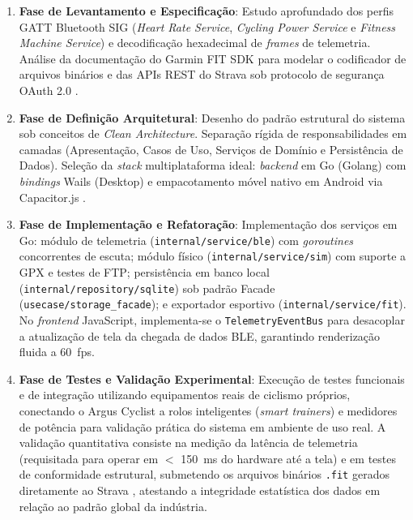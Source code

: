 \documentclass[
    a4paper,
    12pt,
    oneside,
    english,
    brazil,
    chapter=TITLE,
    section=TITLE,
]{abntex2}
\begin{document}
\begin{enumerate}
    \item \textbf{Fase de Levantamento e Especificação}: Estudo aprofundado dos perfis GATT Bluetooth SIG (\textit{Heart Rate Service}, \textit{Cycling Power Service} e \textit{Fitness Machine Service}) e decodificação hexadecimal de \textit{frames} de telemetria. Análise da documentação do Garmin FIT SDK \cite{garmin2024} para modelar o codificador de arquivos binários e das APIs REST do Strava sob protocolo de segurança OAuth 2.0 \cite{strava2025}.

    \item \textbf{Fase de Definição Arquitetural}: Desenho do padrão estrutural do sistema sob conceitos de \textit{Clean Architecture}. Separação rígida de responsabilidades em camadas (Apresentação, Casos de Uso, Serviços de Domínio e Persistência de Dados). Seleção da \textit{stack} multiplataforma ideal: \textit{backend} em Go (Golang) com \textit{bindings} Wails (Desktop) e empacotamento móvel nativo em Android via Capacitor.js \cite{capacitor2024}.

    \item \textbf{Fase de Implementação e Refatoração}: Implementação dos serviços em Go: módulo de telemetria (\texttt{internal/service/ble}) com \textit{goroutines} concorrentes de escuta; módulo físico (\texttt{internal/service/sim}) com suporte a GPX e testes de FTP; persistência em banco local (\texttt{internal/repository/sqlite}) sob padrão Facade (\texttt{usecase/storage\_facade}); e exportador esportivo (\texttt{internal/service/fit}). No \textit{frontend} JavaScript, implementa-se o \texttt{TelemetryEventBus} para desacoplar a atualização de tela da chegada de dados BLE, garantindo renderização fluida a 60~fps.

    \item \textbf{Fase de Testes e Validação Experimental}: Execução de testes funcionais e de integração utilizando equipamentos reais de ciclismo próprios, conectando o Argus Cyclist a rolos inteligentes (\textit{smart trainers}) e medidores de potência para validação prática do sistema em ambiente de uso real. A validação quantitativa consiste na medição da latência de telemetria (requisitada para operar em $<$ \SI{150}{\milli\second} do hardware até a tela) e em testes de conformidade estrutural, submetendo os arquivos binários \texttt{.fit} gerados diretamente ao Strava \cite{strava2025}, atestando a integridade estatística dos dados em relação ao padrão global da indústria.
\end{enumerate}
\end{document}
